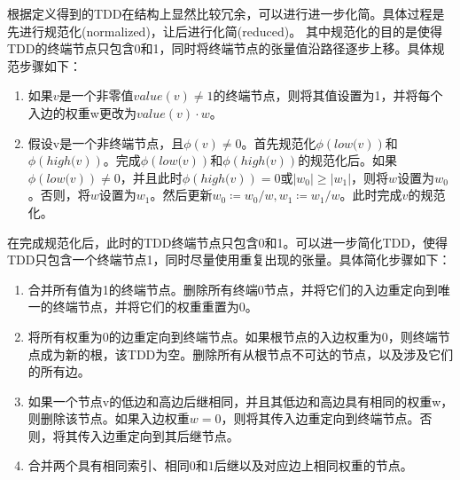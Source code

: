 \label{sec-reduce}
根据定义得到的TDD在结构上显然比较冗余，可以进行进一步化简。具体过程是先进行规范化(normalized)，让后进行化简(reduced)\citep{Hong_2022}。
其中规范化的目的是使得TDD的终端节点只包含0和1，同时将终端节点的张量值沿路径逐步上移。具体规范步骤如下：
\begin{enumerate}
    \item 如果$v$是一个非零值$value\left(v\right)\neq 1$的终端节点，则将其值设置为1，并将每个入边的权重w更改为$value\left(v\right)\cdot w$。\label{norm1}
    \item 假设v是一个非终端节点，且$\phi\left(v\right)\neq 0$。首先规范化$\phi\left.\left(low(v\right)\right)$和$\phi\left.\left(high(v\right)\right)$。完成$\phi\left.\left(low(v\right)\right)$和$\phi\left.\left(high(v\right)\right)$的规范化后。如果$\phi\left.\left(low(v\right)\right)\neq 0$，并且此时$\phi\left.\left(high(v\right)\right)=0$或$\left|w_0\right|\geq\left|w_1\right|$，则将$w$设置为$w_0$。否则，将$w$设置为$w_1$。然后更新$w_0≔w_0/w,w_1≔w_1/w$。此时完成$v$的规范化。\label{norm2}
\end{enumerate}



在完成规范化后，此时的TDD终端节点只包含0和1。可以进一步简化TDD，使得TDD只包含一个终端节点1，同时尽量使用重复出现的张量。具体简化步骤如下：
\begin{enumerate}
    \item 	合并所有值为1的终端节点。删除所有终端$0$节点，并将它们的入边重定向到唯一的终端节点，并将它们的权重重置为$0$。\label{sympl1}
	\item 将所有权重为$0$的边重定向到终端节点。如果根节点的入边权重为$0$，则终端节点成为新的根，该TDD为空。删除所有从根节点不可达的节点，以及涉及它们的所有边。\label{sympl2}
	\item 如果一个节点v的低边和高边后继相同，并且其低边和高边具有相同的权重w，则删除该节点。如果入边权重$w=0$，则将其传入边重定向到终端节点。否则，将其传入边重定向到其后继节点。\label{sympl3}
	\item 合并两个具有相同索引、相同$0$和$1$后继以及对应边上相同权重的节点。\label{sympl4}
\end{enumerate}


